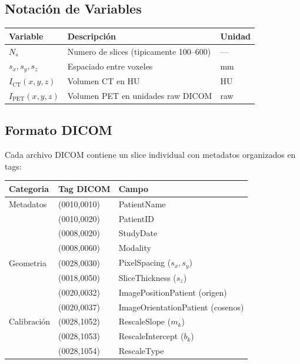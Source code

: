 \documentclass[12pt,a4paper]{article}
\begin{document}
\subsection{Notación de Variables}

\begin{table}[H]
\centering
\begin{tabular}{lll}
\toprule
\textbf{Variable} & \textbf{Descripción} & \textbf{Unidad} \\
\midrule
$N_s$ & Numero de slices (tipicamente 100--600) & --- \\
$s_x, s_y, s_z$ & Espaciado entre voxeles & mm \\
$I_{\text{CT}}(x,y,z)$ & Volumen CT en HU & HU \\
$I_{\text{PET}}(x,y,z)$ & Volumen PET en unidades raw DICOM & raw \\
\bottomrule
\end{tabular}
\end{table}

\subsection{Formato DICOM}

Cada archivo DICOM contiene un slice individual con metadatos organizados en tags:

\begin{table}[H]
\centering
\begin{tabular}{lll}
\toprule
\textbf{Categoria} & \textbf{Tag DICOM} & \textbf{Campo} \\
\midrule
Metadatos & (0010,0010) & PatientName \\
 & (0010,0020) & PatientID \\
 & (0008,0020) & StudyDate \\
 & (0008,0060) & Modality \\
Geometria & (0028,0030) & PixelSpacing ($s_x, s_y$) \\
 & (0018,0050) & SliceThickness ($s_z$) \\
 & (0020,0032) & ImagePositionPatient (origen) \\
 & (0020,0037) & ImageOrientationPatient (cosenos) \\
Calibración & (0028,1052) & RescaleSlope ($m_k$) \\
 & (0028,1053) & RescaleIntercept ($b_k$) \\
 & (0028,1054) & RescaleType \\
\bottomrule
\end{tabular}
\end{table}
\end{document}
